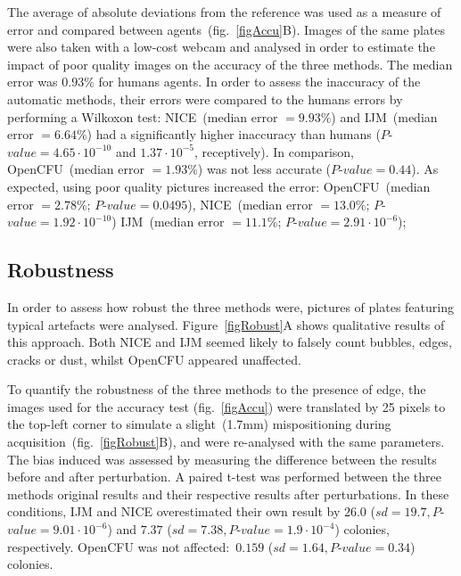 \documentclass[10pt]{article}
\newcommand{\IJM}{IJM}
\newcommand{\EdgeNoiseOCFU}{$0.159$ ($sd=1.64, P$-$value=0.34$)}
\newcommand{\EdgeNoiseIJM}{$26.0$ ($sd=19.7, P$-$value=9.01\cdot 10^{-6}$)}
\newcommand{\EdgeNoiseNICE}{$7.37$ ($sd=7.38,P$-$value=1.9\cdot 10^{-4}$)}
\begin{document}
The average of absolute deviations from the reference was used
as a measure of error and compared between agents~(fig.~\ref{figAccu}B).
Images of the same plates were also taken with a low-cost webcam and analysed in
order to estimate the impact of poor quality images on the accuracy of the three
methods.
The median error was $0.93\%$ for humans agents. In order to assess the
inaccuracy of the automatic methods, their errors were compared to the humans
errors by performing a Wilkoxon test:
NICE~(median error $= 9.93\%$) and \IJM{}~(median error $= 6.64\%$) had a significantly higher inaccuracy than
humans ($P$-$value = 4.65\cdot 10^{-10}$ and $1.37\cdot 10^{-5}$, receptively).
In comparison, OpenCFU~(median error $= 1.93\%$) was not less accurate ($P$-$value = 0.44$).
As expected, using poor quality pictures increased the error: OpenCFU~(median error $= 2.78\%$; $P$-$value =
0.0495$), NICE~(median error $= 13.0\%$; $P$-$value = 1.92 \cdot 10^{-10}$) \IJM{}~(median error $= 11.1\%$; $P$-$value = 2.91 \cdot 10^{-6} $);

\subsection*{Robustness} 
In order to assess how robust the three methods were,
pictures of plates featuring typical artefacts were analysed.
Figure~\ref{figRobust}A shows qualitative results of this approach.
Both NICE and \IJM{} seemed likely to falsely count bubbles, edges, cracks or
dust, whilst OpenCFU appeared unaffected.

To quantify the robustness of the three methods to the presence of edge, the
images used for the accuracy test (fig.~\ref{figAccu}) were translated by 25 pixels to the top-left
corner to simulate a slight~(1.7mm) mispositioning during
acquisition~(fig.~\ref{figRobust}B), and were re-analysed with the same
parameters.
The bias induced was assessed by measuring the difference between the results
before and after perturbation. A paired t-test was performed between the three
methods original results and their respective results after perturbations.
In these conditions, \IJM{} and NICE overestimated their own result by
\EdgeNoiseIJM{} and \EdgeNoiseNICE{} colonies, respectively. OpenCFU was not affected:~\EdgeNoiseOCFU{} colonies.
\end{document}
